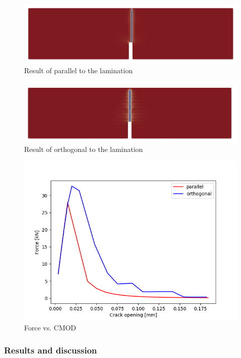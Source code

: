 \begin{figure}[!ht]
\centering
\includegraphics[width=1\textwidth]{figures/ME1_ext_2D_para_result.png}
\caption{Result of parallel to the lamination}
\label{fig:ME1_ext_vpf_para_result}
\end{figure}

\begin{figure}[!ht]
\centering
\includegraphics[width=1\textwidth]{figures/ME1_ext_2D_orth_result.png}
\caption{Result of orthogonal to the lamination}
\label{fig:ME1_ext_vpf_orth_result}
\end{figure}

\begin{figure}[!ht]
\centering
\includegraphics[width=1\textwidth]{figures/ME1_ext_NFvsCMOD.png}
\caption{Force vs. CMOD}
\label{fig:ME1_ext_vpf_FvsCMOD}
\end{figure}


\subsubsection{Results and discussion}

